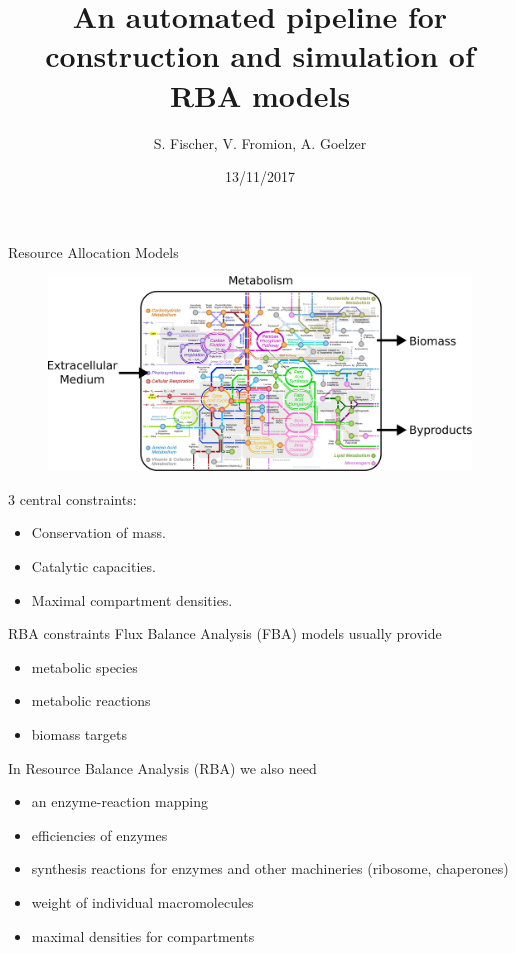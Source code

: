 \documentclass{beamer}
\begin{document}
\title{An automated pipeline for construction and simulation of RBA models}
\author{S. Fischer, V. Fromion, A. Goelzer}
\date{13/11/2017}
\maketitle

\begin{frame}{Resource Allocation Models}
  \begin{figure}
    \centering
    \includegraphics[width=\linewidth]{intro}
  \end{figure}
  3 central constraints:
  \begin{itemize}
    \item Conservation of mass.
    \item Catalytic capacities.
    \item Maximal compartment densities.
  \end{itemize}
\end{frame}

\begin{frame}{RBA constraints}
  Flux Balance Analysis (FBA) models usually provide
  \begin{itemize}
    \item metabolic species
    \item metabolic reactions
    \item biomass targets
  \end{itemize}

  In Resource Balance Analysis (RBA) we also need
  \begin{itemize}
    \item an enzyme-reaction mapping
    \item efficiencies of enzymes
    \item synthesis reactions for enzymes
    and other machineries (ribosome, chaperones)
    \item weight of individual macromolecules
    \item maximal densities for compartments
  \end{itemize}
\end{frame}
\end{document}
